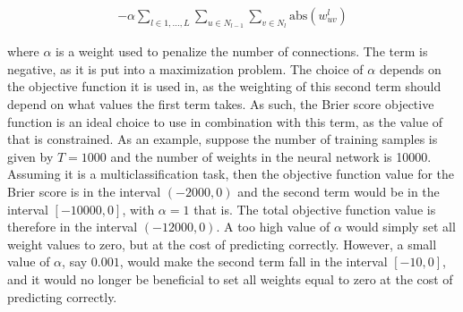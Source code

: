 \begin{align}
    \label{min_connections}  - \alpha \sum_{l\in{1, \ldots, L}} \sum_{u \in N_{l-1}} \sum_{v \in N_l}  \text{abs}(w^l_{uv})
\end{align}

\noindent where $\alpha$ is a weight used to penalize the number of connections. The term is negative, as it is put into a maximization problem. The choice of $\alpha$ depends on the objective function it is used in, as the weighting of this second term should depend on what values the first term takes. As such, the Brier score objective function is an ideal choice to use in combination with this term, as the value of that is constrained. As an example, suppose the number of training samples is given by $T = 1000$ and the number of weights in the neural network is 10000. Assuming it is a multiclassification task, then the objective function value for the Brier score is in the interval $(-2000, 0)$ and the second term would be in the interval $[-10000, 0]$, with $\alpha = 1$ that is. The total objective function value is therefore in the interval $(-12000, 0)$. A too high value of $\alpha$ would simply set all weight values to zero, but at the cost of predicting correctly. However, a small value of $\alpha$, say $0.001$, would make the second term fall in the interval $[-10, 0]$, and it would no longer be beneficial to set all weights equal to zero at the cost of predicting correctly. 









